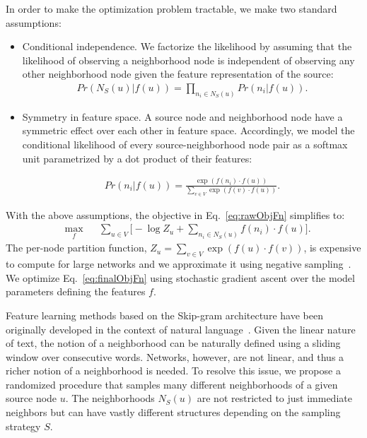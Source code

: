 In order to make the optimization problem tractable, we make two standard assumptions:
\begin{itemize}[noitemsep,nolistsep]
	\item Conditional independence. We factorize the likelihood by assuming that the likelihood of observing a neighborhood node is independent of observing any other neighborhood node given the feature representation of the source:
	\begin{align}
		Pr(N_S(u)| f(u)) = \prod_{n_i \in N_S(u)} Pr(n_i | f(u)). \nonumber
	\end{align}
	\item Symmetry in feature space. A source node and neighborhood node have a symmetric effect over each other in feature space. Accordingly, we model the conditional likelihood of every source-neighborhood node pair as a softmax unit parametrized by a dot product of their features:

	\begin{align}
	Pr(n_i | f(u)) = \frac{\exp(f(n_i)\cdot f(u))}{\sum_{v \in V} \exp(f(v)\cdot f(u))}. \nonumber
	\end{align}
\end{itemize}
%
With the above assumptions, the objective in Eq.~\ref{eq:rawObjFn} simplifies to:
%
\vspace{-0.05in}
\begin{equation}\label{eq:finalObjFn}
	\begin{aligned}
	& \underset{f}{\text{max}}
	& &    \sum_{u \in V} \bigg[- \log Z_u + \sum_{n_i \in N_S(u)} f(n_i)\cdot f(u)\bigg].
	\end{aligned}
\end{equation}
%
The per-node partition function, $Z_u=\sum_{v \in V} \exp(f(u)\cdot f(v))$, is expensive to compute for large networks and we approximate it using negative sampling~\cite{word2vec2}. We optimize Eq.~\ref{eq:finalObjFn} using stochastic gradient ascent over the model parameters defining the features $f$.

Feature learning methods based on the Skip-gram architecture have been originally developed in the context of natural language~\cite{word2vec}. Given the linear nature of text, the notion of a neighborhood can be naturally defined using a sliding window over consecutive words. Networks, however, are not linear, and thus a richer notion of a neighborhood is needed.
%
To resolve this issue, we propose a randomized procedure that samples many different neighborhoods of a given source node $u$. The neighborhoods $N_S(u)$ are not restricted to just immediate neighbors but can have vastly different structures depending on the sampling strategy $S$. 

